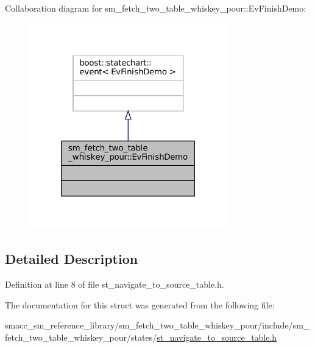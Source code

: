 Collaboration diagram for sm\+\_\+fetch\+\_\+two\+\_\+table\+\_\+whiskey\+\_\+pour\+:\+:Ev\+Finish\+Demo\+:
\nopagebreak
\begin{figure}[H]
\begin{center}
\leavevmode
\includegraphics[width=244pt]{structsm__fetch__two__table__whiskey__pour_1_1EvFinishDemo__coll__graph}
\end{center}
\end{figure}


\subsection{Detailed Description}


Definition at line 8 of file st\+\_\+navigate\+\_\+to\+\_\+source\+\_\+table.\+h.



The documentation for this struct was generated from the following file\+:\begin{DoxyCompactItemize}
\item 
smacc\+\_\+sm\+\_\+reference\+\_\+library/sm\+\_\+fetch\+\_\+two\+\_\+table\+\_\+whiskey\+\_\+pour/include/sm\+\_\+fetch\+\_\+two\+\_\+table\+\_\+whiskey\+\_\+pour/states/\hyperlink{sm__fetch__two__table__whiskey__pour_2include_2sm__fetch__two__table__whiskey__pour_2states_2st__navigate__to__source__table_8h}{st\+\_\+navigate\+\_\+to\+\_\+source\+\_\+table.\+h}\end{DoxyCompactItemize}
